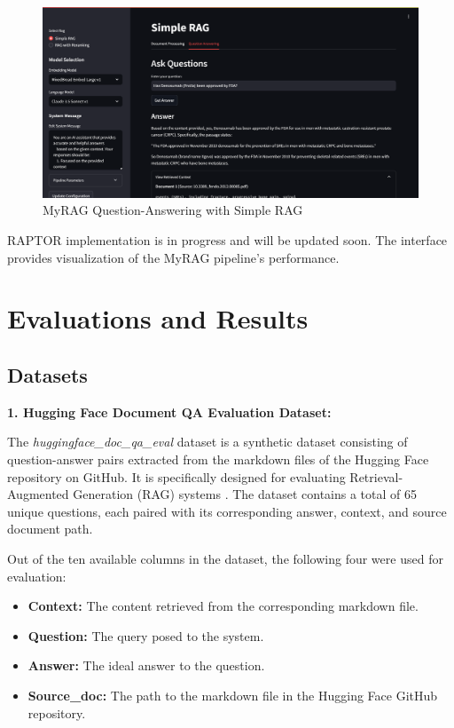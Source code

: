 \documentclass{scrartcl}
\begin{document}
\begin{figure}[H]
    \centering
    \includegraphics[width=\textwidth]{MyRAG_UI_QA.png}
    \caption{MyRAG Question-Answering with Simple RAG}
    \label{fig:qa_interface}
\end{figure}

 RAPTOR implementation is in progress and will be updated soon. The interface provides visualization of the MyRAG pipeline's performance.

\section{Evaluations and Results}

\subsection{Datasets}

\textbf{1. Hugging Face Document QA Evaluation Dataset:}

The \textit{huggingface\_doc\_qa\_eval} dataset is a synthetic dataset consisting of question-answer pairs extracted from the markdown files of the Hugging Face repository on GitHub. It is specifically designed for evaluating Retrieval-Augmented Generation (RAG) systems \cite{huggingface2024docqa}. The dataset contains a total of 65 unique questions, each paired with its corresponding answer, context, and source document path.

Out of the ten available columns in the dataset, the following four were used for evaluation:
\begin{itemize}
    \item \textbf{Context:} The content retrieved from the corresponding markdown file.
    \item \textbf{Question:} The query posed to the system.
    \item \textbf{Answer:} The ideal answer to the question.
    \item \textbf{Source\_doc:} The path to the markdown file in the Hugging Face GitHub repository.
\end{itemize}
\end{document}
